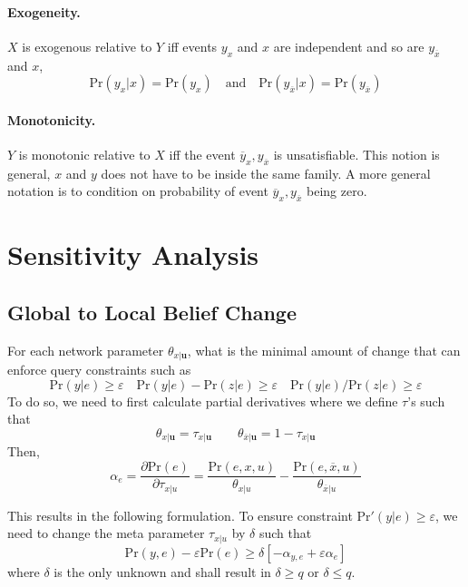 \documentclass[11pt]{article}
\newcommand{\bu}{\mathbf{u}}
\newcommand{\pr}{\mathrm{Pr}}
\begin{document}
\paragraph{Exogeneity.} $X$ is exogenous relative to $Y$ iff events $y_x$ and $x$ are independent and so are $y_{\overbar x}$ and $x$,
\begin{equation}
	\pr (y_x | x) = \pr (y_x) \quad \text{and} \quad \pr (y_{\overbar x}| x) = \pr ( y_{\overbar x}) 
\end{equation}

\paragraph{Monotonicity.} $Y$ is monotonic relative to $X$ iff the event $\overbar y _ x, y_{\overbar x}$ is unsatisfiable. This notion is general, $x$ and $y$ does not have to be inside the same family. A more general notation is to condition on probability of event $\overbar y _ x, y_{\overbar x}$ being zero. 

\section{Sensitivity Analysis}
\subsection{Global to Local Belief Change}
For each network parameter $\theta_{x | \bu}$, what is the minimal amount of change that can enforce query constraints such as 
\begin{equation}
	\pr (y | e) \geq \varepsilon \quad 
	\pr (y | e) - \pr(z | e ) \geq \varepsilon \quad 
	\pr (y | e) / \pr( z | e) \geq  \varepsilon
\end{equation}
To do so, we need to first calculate partial derivatives where we define $\tau$'s such that 
\begin{equation}
	\theta_{x|\bu} = \tau_{x | \bu} \quad \quad 
	\theta_{\overbar x |\bu} = 1 - \tau_{x | \bu}
\end{equation}
Then, 
\begin{equation}
	\alpha_e = \frac{\partial \pr(e)}{\partial \tau_{x | u}} = \frac{\pr(e, x, u)}{\theta_{x | u}} - \frac{\pr( e, \overbar x, u)}{\theta_{\overbar x | u}}
\end{equation}

This results in the following formulation. To ensure constraint $\pr'(y | e) \geq \varepsilon$, we need to change the meta parameter $\tau_{x |u}$ by $\delta$ such that 
\begin{equation}
	\pr(y, e) - \varepsilon\pr(e) \geq \delta[- \alpha _{y, e} + \varepsilon \alpha _e]
\end{equation}
where $\delta$ is the only unknown and shall result in $\delta \geq q$ or $\delta \leq q$. 
\end{document}
